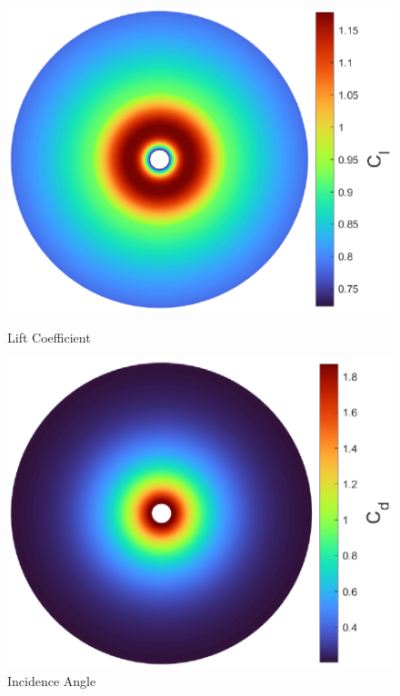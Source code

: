 {\begin{figure}[!htb]
    \centering
    \begin{minipage}{.49\textwidth}
      \centering
      \includegraphics[width=\textwidth]{Figures/comp_method/sim_B/cl.eps}
      \caption[Lift Coefficient]{Lift Coefficient}
      \label{fig:imagem111}
    \end{minipage}%
    \begin{minipage}{.01\textwidth}
         \hfill
    \end{minipage}
    \begin{minipage}{.49\textwidth}
      \centering
      \includegraphics[width=\textwidth]{Figures/comp_method/sim_B/cd.eps}
      \caption[Incidence angle]{Incidence Angle}
      \label{fig:imagem311}
    \end{minipage}
\end{figure}


}
